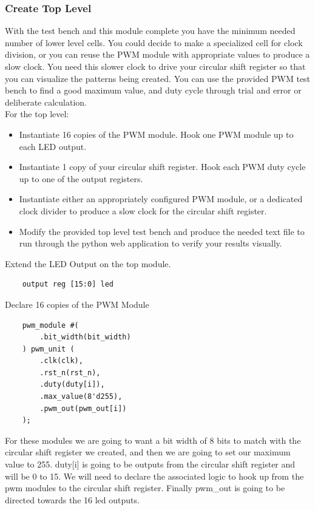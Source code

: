 \subsubsection{Create Top Level}

With the test bench and this module complete you have the minimum needed number of lower level cells. You could decide to make a specialized cell for clock division, or you can reuse the PWM module with appropriate values to produce a slow clock. You need this slower clock to drive your circular shift register so that you can visualize the patterns being created. You can use the provided PWM test bench to find a good maximum value, and duty cycle through trial and error or deliberate calculation. \\
\vspace{0.5cm}
For the top level:
\begin{itemize}
    \item Instantiate 16 copies of the PWM module. Hook one PWM module up to each LED output. 
    \item Instantiate 1 copy of your circular shift register. Hook each PWM duty cycle up to one of the output registers. 
    \item Instantiate either an appropriately configured PWM module, or a dedicated clock divider to produce a slow clock for the circular shift register. 
    \item Modify the provided top level test bench and produce the needed text file to run through the python web application to verify your results visually. 
\end{itemize}
Extend the LED Output on the top module.
\begin{verbatim}
    output reg [15:0] led
\end{verbatim}
Declare 16 copies of the PWM Module
\begin{verbatim}
    pwm_module #(
        .bit_width(bit_width)
    ) pwm_unit (
        .clk(clk),
        .rst_n(rst_n),
        .duty(duty[i]),
        .max_value(8'd255),
        .pwm_out(pwm_out[i])
    );
\end{verbatim}
For these modules we are going to want a bit width of 8 bits to match with the circular shift register we created, and then we are going to set our maximum value to 255. duty[i] is going to be outputs from the circular shift register and will be 0 to 15. We will need to declare the associated logic to hook up from the pwm modules to the circular shift register. Finally pwm\_out is going to be directed towards the 16 led outputs. \\

